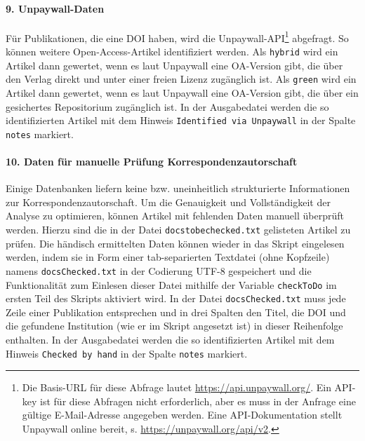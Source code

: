 \paragraph{9. Unpaywall-Daten} \label{oaDOI}
Für Publikationen, die eine DOI haben, wird die Unpaywall-API\footnote{Die Basis-URL für diese Abfrage lautet \url{https://api.unpaywall.org/}. Ein API-key ist für diese Abfragen nicht erforderlich, aber es muss in der Anfrage eine gültige E-Mail-Adresse angegeben werden. Eine API-Dokumentation stellt Unpaywall online bereit, s. \url{https://unpaywall.org/api/v2}.} abgefragt. So können weitere Open-Access-Artikel identifiziert werden. Als \texttt{hybrid} wird ein Artikel dann gewertet, wenn es laut Unpaywall eine OA-Version gibt, die über den Verlag direkt und unter einer freien Lizenz zugänglich ist. Als \texttt{green} wird ein Artikel dann gewertet, wenn es laut Unpaywall eine OA-Version gibt, die über ein gesichertes Repositorium zugänglich ist. In der Ausgabedatei werden die so identifizierten Artikel mit dem Hinweis \texttt{Identified via Unpaywall} in der Spalte \texttt{notes} markiert.

\paragraph{10. Daten für manuelle Prüfung Korrespondenzautorschaft} \label{man-corr-author}

Einige Datenbanken liefern keine bzw. uneinheitlich strukturierte Informationen zur Korres\-pondenzautorschaft. Um die Genauigkeit und Vollständigkeit der Analyse zu optimieren, können Artikel mit fehlenden Daten manuell überprüft werden. Hierzu sind die in der Datei \texttt{docstobechecked.txt} gelisteten Artikel zu prüfen. Die händisch ermittelten Daten können wieder in das Skript eingelesen werden, indem sie in Form einer tab-separierten Textdatei (ohne Kopfzeile) namens \texttt{docsChecked.txt} in der Codierung UTF-8 gespeichert und die Funktionalität zum Einlesen dieser Datei mithilfe der Variable \texttt{checkToDo} im ersten Teil des Skripts aktiviert wird. In der Datei \texttt{docsChecked.txt} muss jede Zeile einer Publikation entsprechen und in drei Spalten den Titel, die DOI und die gefundene Institution (wie er im Skript angesetzt ist) in dieser Reihenfolge enthalten. In der Ausgabedatei werden die so identifizierten Artikel mit dem Hinweis \texttt{Checked by hand} in der Spalte \texttt{notes} markiert.

